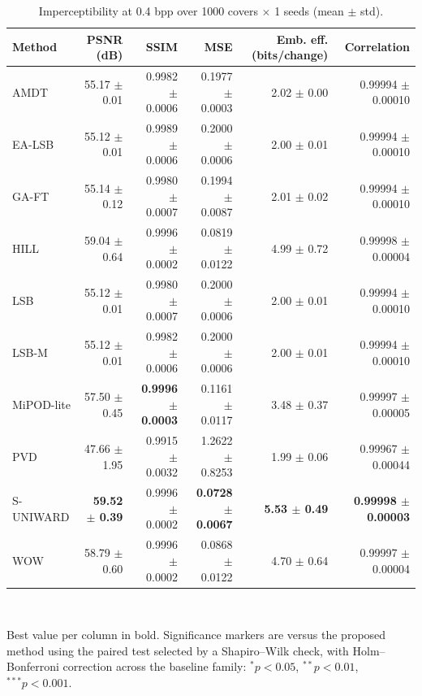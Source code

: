 \begin{table}[!t]
\centering
\caption{Imperceptibility at 0.4 bpp over 1000 covers $\times$ 1 seeds (mean $\pm$ std).}
\label{tab:quality}
\footnotesize
\begin{tabular}{lrrrrr}
\toprule
Method & PSNR (dB) & SSIM & MSE & Emb. eff. (bits/change) & Correlation \\
\midrule
AMDT & 55.17 $\pm$ 0.01 & 0.9982 $\pm$ 0.0006 & 0.1977 $\pm$ 0.0003 & 2.02 $\pm$ 0.00 & 0.99994 $\pm$ 0.00010 \\
EA-LSB & 55.12 $\pm$ 0.01 & 0.9989 $\pm$ 0.0006 & 0.2000 $\pm$ 0.0006 & 2.00 $\pm$ 0.01 & 0.99994 $\pm$ 0.00010 \\
GA-FT & 55.14 $\pm$ 0.12 & 0.9980 $\pm$ 0.0007 & 0.1994 $\pm$ 0.0087 & 2.01 $\pm$ 0.02 & 0.99994 $\pm$ 0.00010 \\
HILL & 59.04 $\pm$ 0.64 & 0.9996 $\pm$ 0.0002 & 0.0819 $\pm$ 0.0122 & 4.99 $\pm$ 0.72 & 0.99998 $\pm$ 0.00004 \\
LSB & 55.12 $\pm$ 0.01 & 0.9980 $\pm$ 0.0007 & 0.2000 $\pm$ 0.0006 & 2.00 $\pm$ 0.01 & 0.99994 $\pm$ 0.00010 \\
LSB-M & 55.12 $\pm$ 0.01 & 0.9982 $\pm$ 0.0006 & 0.2000 $\pm$ 0.0006 & 2.00 $\pm$ 0.01 & 0.99994 $\pm$ 0.00010 \\
MiPOD-lite & 57.50 $\pm$ 0.45 & \textbf{0.9996 $\pm$ 0.0003} & 0.1161 $\pm$ 0.0117 & 3.48 $\pm$ 0.37 & 0.99997 $\pm$ 0.00005 \\
PVD & 47.66 $\pm$ 1.95 & 0.9915 $\pm$ 0.0032 & 1.2622 $\pm$ 0.8253 & 1.99 $\pm$ 0.06 & 0.99967 $\pm$ 0.00044 \\
S-UNIWARD & \textbf{59.52 $\pm$ 0.39} & 0.9996 $\pm$ 0.0002 & \textbf{0.0728 $\pm$ 0.0067} & \textbf{5.53 $\pm$ 0.49} & \textbf{0.99998 $\pm$ 0.00003} \\
WOW & 58.79 $\pm$ 0.60 & 0.9996 $\pm$ 0.0002 & 0.0868 $\pm$ 0.0122 & 4.70 $\pm$ 0.64 & 0.99997 $\pm$ 0.00004 \\
\bottomrule
\end{tabular}
\\[2pt] \parbox{\linewidth}{\scriptsize Best value per column in bold. Significance markers are versus the proposed method using the paired test selected by a Shapiro--Wilk check, with Holm--Bonferroni correction across the baseline family: $^{*}p<0.05$, $^{**}p<0.01$, $^{***}p<0.001$.}
\end{table}
